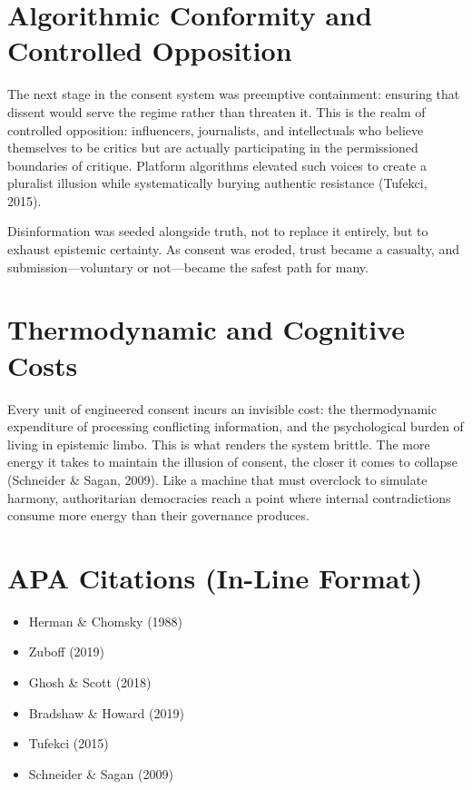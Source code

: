 \documentclass[
]{article}
\providecommand{\tightlist}{%
  \setlength{\itemsep}{0pt}\setlength{\parskip}{0pt}}
\begin{document}
\section*{Algorithmic Conformity and Controlled Opposition}

The next stage in the consent system was preemptive containment: ensuring that dissent would serve the regime rather than threaten it. This is the realm of controlled opposition: influencers, journalists, and intellectuals who believe themselves to be critics but are actually participating in the permissioned boundaries of critique. Platform algorithms elevated such voices to create a pluralist illusion while systematically burying authentic resistance (Tufekci, 2015).

Disinformation was seeded alongside truth, not to replace it entirely, but to exhaust epistemic certainty. As consent was eroded, trust became a casualty, and submission---voluntary or not---became the safest path for many.

\section*{Thermodynamic and Cognitive Costs}

Every unit of engineered consent incurs an invisible cost: the thermodynamic expenditure of processing conflicting information, and the psychological burden of living in epistemic limbo. This is what renders the system brittle. The more energy it takes to maintain the illusion of consent, the closer it comes to collapse (Schneider \& Sagan, 2009). Like a machine that must overclock to simulate harmony, authoritarian democracies reach a point where internal contradictions consume more energy than their governance produces.

\section*{APA Citations (In-Line Format)}

\begin{itemize}
\tightlist
\item
  Herman \& Chomsky (1988)
\item
  Zuboff (2019)
\item
  Ghosh \& Scott (2018)
\item
  Bradshaw \& Howard (2019)
\item
  Tufekci (2015)
\item
  Schneider \& Sagan (2009)
\end{itemize}
\end{document}

